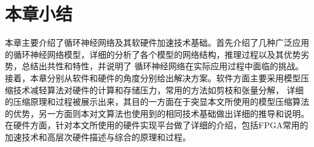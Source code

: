 \section{本章小结}
本章主要介绍了循环神经网络及其软硬件加速技术基础。首先介绍了几种广泛应用的循环神经网络模型，详细的分析了各个模型的网络结构，推理过程以及其优势劣势，总结出共性和特性，并说明了
循环神经网络在实际应用过程中面临的挑战。接着，本章分别从软件和硬件的角度分别给出解决方案。软件方面主要采用模型压缩技术减轻算法对硬件的计算和存储压力，常用的方法如剪枝和张量分解，
详细的压缩原理和过程被展示出来，其目的一方面在于突显本文所使用的模型压缩算法的优势，另一方面则本对文算法也使用到的相同技术基础做出详细的推导和说明。
在硬件方面，针对本文所使用的硬件实现平台做了详细的介绍，包括FPGA常用的加速技术和高层次硬件描述与综合的原理和过程。
